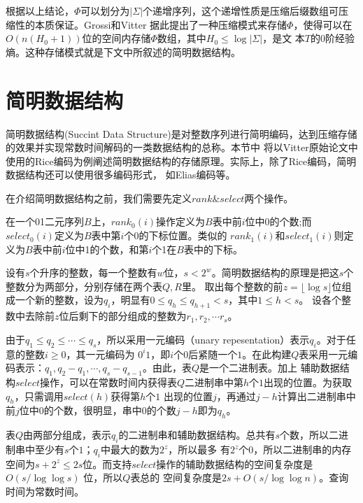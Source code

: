 根据以上结论，$\Phi$可以划分为$|\Sigma|$个递增序列，这个递增性质是压缩后缀数组可压缩性的本质保证。Grossi和Vitter\cite{grossi2005compressed}
据此提出了一种压缩模式来存储$\Phi$，使得可以在$O(n(H_0+1))$位的空间内存储$\Phi$数组，其中$H_0 \leq \log |\Sigma|$，是文
本$T$的0阶经验熵。这种存储模式就是下文中所叙述的简明数据结构。

\section{简明数据结构}

简明数据结构(Succint Data Structure)是对整数序列进行简明编码，达到压缩存储的效果并实现常数时间解码的一类数据结构的总称。本节中
将以Vitter原始论文中使用的Rice编码为例阐述简明数据结构的存储原理。实际上，除了Rice编码，简明数据结构还可以使用很多编码形式，
如Elias编码\cite{witten1999managing}等。

在介绍简明数据结构之前，我们需要先定义$rank\&select$两个操作。

\begin{defn}\label{def:rank}
在一个01二元序列$B$上，$rank_0(i)$操作定义为$B$表中前$i$位中0的个数;而$select_0(i)$定义为$B$表中第$i$个0的下标位置。类似的
$rank_1(i)$和$select_1(i)$则定义为$B$表中前$i$位中1的个数，和第$i$个1在$B$表中的下标。
\end{defn}

设有$s$个升序的整数，每一个整数有$w$位，$s<2^w$。简明数据结构的原理是把这$s$个整数分为两部分，分别存储在两个表$Q,R$里。
取出每个整数的前$z=\lfloor \log s\rfloor $位组成一个新的整数，设为$q_i$，明显有$0 \leq q_h \leq q_{h+1} < s$，其中$1 \leq h < s$。
设各个整数中去除前$z$位后剩下的部分组成的整数为$r_1,r_2,\cdots r_s$。

由于$q_1 \leq q_2 \leq \cdots \leq q_s$，所以采用一元编码（unary repesentation）表示$q_i$。对于任意的整数$i \geq 0$，其一元编码为
$0^i1$，即$i$个$0$后紧随一个$1$。在此构建$Q$表采用一元编码表示：$q_1,q_2-q_1,\cdots ,q_s-q_{s-1}$。由此，表$Q$是一个二进制表。加上
辅助数据结构$select$操作，可以在常数时间内获得表$Q$二进制串中第$h$个$1$出现的位置。为获取$q_h$，只需调用$select(h)$获得第$h$个$1$
出现的位置$j$，再通过$j-h$计算出二进制串中前$j$位中$0$的个数，很明显，串中$0$的个数$j-h$即为$q_h$。

表$Q$由两部分组成，表示$q_i$的二进制串和辅助数据结构。总共有$s$个数，所以二进制串中至少有$s$个$1$；$q_i$中最大的数为$2^z$，所以最多
有$2^z$个$0$，所以二进制串的内存空间为$s+2^z \leq 2s$位。而支持$select$操作的辅助数据结构的空间复杂度是$O(s/\log \log s)$ 位，所以$Q$表总的
空间复杂度是$2s+O(s/\log \log n)$。查询时间为常数时间。

